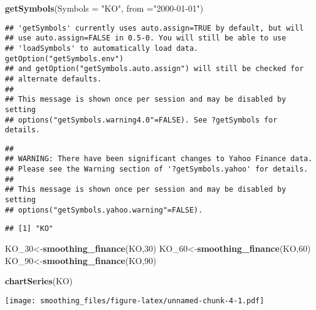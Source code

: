 \documentclass[]{article}
\newenvironment{Shaded}{\begin{snugshade}}{\end{snugshade}}
\newcommand{\KeywordTok}[1]{\textcolor[rgb]{0.13,0.29,0.53}{\textbf{#1}}}
\newcommand{\DataTypeTok}[1]{\textcolor[rgb]{0.13,0.29,0.53}{#1}}
\newcommand{\DecValTok}[1]{\textcolor[rgb]{0.00,0.00,0.81}{#1}}
\newcommand{\StringTok}[1]{\textcolor[rgb]{0.31,0.60,0.02}{#1}}
\newcommand{\NormalTok}[1]{#1}
\begin{document}
\begin{Shaded}
\begin{Highlighting}[]
\KeywordTok{getSymbols}\NormalTok{(}\DataTypeTok{Symbols =} \StringTok{"KO"}\NormalTok{, }\DataTypeTok{from =}\StringTok{"2000-01-01"}\NormalTok{)}
\end{Highlighting}
\end{Shaded}

\begin{verbatim}
## 'getSymbols' currently uses auto.assign=TRUE by default, but will
## use auto.assign=FALSE in 0.5-0. You will still be able to use
## 'loadSymbols' to automatically load data. getOption("getSymbols.env")
## and getOption("getSymbols.auto.assign") will still be checked for
## alternate defaults.
## 
## This message is shown once per session and may be disabled by setting 
## options("getSymbols.warning4.0"=FALSE). See ?getSymbols for details.
\end{verbatim}

\begin{verbatim}
## 
## WARNING: There have been significant changes to Yahoo Finance data.
## Please see the Warning section of '?getSymbols.yahoo' for details.
## 
## This message is shown once per session and may be disabled by setting
## options("getSymbols.yahoo.warning"=FALSE).
\end{verbatim}

\begin{verbatim}
## [1] "KO"
\end{verbatim}

\begin{Shaded}
\begin{Highlighting}[]
\NormalTok{KO_}\DecValTok{30}\NormalTok{<-}\KeywordTok{smoothing_finance}\NormalTok{(KO,}\DecValTok{30}\NormalTok{)}
\NormalTok{KO_}\DecValTok{60}\NormalTok{<-}\KeywordTok{smoothing_finance}\NormalTok{(KO,}\DecValTok{60}\NormalTok{)}
\NormalTok{KO_}\DecValTok{90}\NormalTok{<-}\KeywordTok{smoothing_finance}\NormalTok{(KO,}\DecValTok{90}\NormalTok{)}
\end{Highlighting}
\end{Shaded}

\begin{Shaded}
\begin{Highlighting}[]
\KeywordTok{chartSeries}\NormalTok{(KO)}
\end{Highlighting}
\end{Shaded}

\texttt{[image: smoothing\_files/figure-latex/unnamed-chunk-4-1.pdf]}
\end{document}
